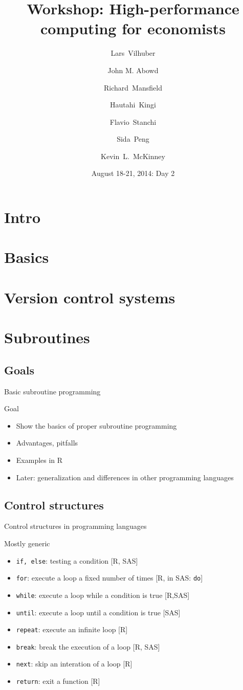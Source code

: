 \documentclass[xcolor=table,compress]{beamer}
\title[Computing for Economists]{Workshop: High-performance computing for economists}
\author[Vilhuber, Abowd, Mansfield, McKinney]{%
  Lars~Vilhuber\inst{1} \and
  John M. Abowd\inst{1} \and
  Richard~Mansfield\inst{1} \and
  Hautahi~Kingi\inst{1} \and
  Flavio~Stanchi\inst{1} \and
  Sida~Peng\inst{1} \and
  Kevin~L.~McKinney %
}
\institute[Cornell]{
  \inst{1}%
   Cornell University, Economics Department,
}%
\date[August 18-21, 2014]{August 18-21, 2014: Day 2}
\begin{document}
\frame{\titlepage}
\section{Intro}
\section{Basics}
\section[VCS]{Version control systems}
\section{Subroutines}

\subsection{Goals}
\begin{frame}{Basic subroutine programming}
\begin{block}{Goal}
\begin{itemize}
\item Show the basics of proper subroutine programming
\item Advantages, pitfalls
\item Examples in R
\item Later: generalization and differences in other programming languages
\end{itemize}
\end{block}
\end{frame}
\subsection[Control]{Control structures}
\begin{frame}{Control structures in programming languages}
\small
\begin{block}{Mostly generic}
\begin{itemize}
\item \texttt{if, else}: testing a condition [R, SAS] 
\item \texttt{for}: execute a loop a fixed number of times [R, in SAS: \texttt{do}]
\item \texttt{while}: execute a loop while a condition is true [R,SAS]
\item \texttt{until}: execute a loop until a condition is true [SAS]
\item \texttt{repeat}: execute an infinite loop [R]
\item \texttt{break}: break the execution of a loop [R, SAS]
\item \texttt{next}: skip an interation of a loop [R]
\item \texttt{return}: exit a function [R]
\end{itemize}
\end{block}
\end{frame}
\end{document}
